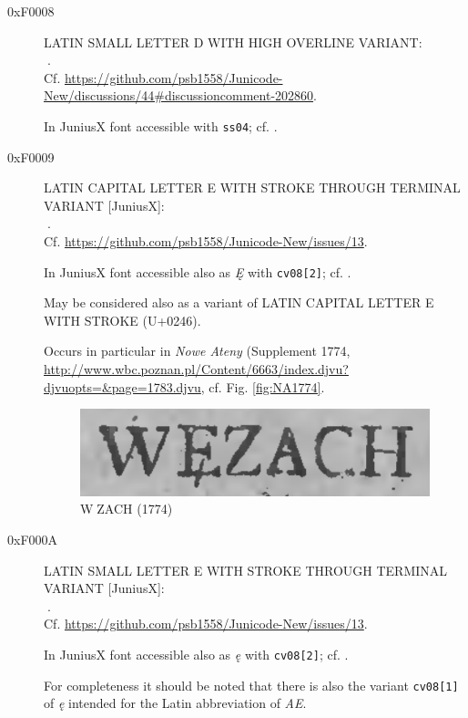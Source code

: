 \documentclass{article}
\newcommand{\Jglyph}[1]{{\relsize{2}\J#1}}
\begin{document}
\begin{description}
  
\item [0xF0008] LATIN SMALL LETTER D WITH HIGH OVERLINE VARIANT:\\
  \Jglyph{󰀈}.\\ Cf. \url{https://github.com/psb1558/Junicode-New/discussions/44#discussioncomment-202860}.

    In JuniusX font accessible  with \texttt{ss04};
  cf. \autocite[p. 6]{baker20:_opent_featur_junius_junius}.

  
\item [0xF0009] LATIN CAPITAL LETTER E WITH STROKE THROUGH TERMINAL VARIANT [JuniusX]:\\
  \Jglyph{󰀉}.\\ Cf. \url{https://github.com/psb1558/Junicode-New/issues/13}.
  
  In JuniusX font accessible also as \textit{Ę} with \texttt{cv08[2]};
  cf. \autocite[p. 8]{baker20:_opent_featur_junius_junius}.

 May be considered also as a variant of LATIN CAPITAL LETTER E WITH
 STROKE (U+0246).

 Occurs in particular in \textit{Nowe Ateny} (Supplement 1774,
 \url{http://www.wbc.poznan.pl/Content/6663/index.djvu?djvuopts=&page=1783.djvu},
 cf. Fig. \vref{fig:NA1774}.
 

  \begin{figure}[h]
    \includegraphics[width=1.3\textwidth]{img/00435077wezach}
    \caption{\J W󰀉ZACH (1774)}
    \label{fig:NA1774}
  \end{figure}

 \item [0xF000A] LATIN SMALL LETTER E WITH STROKE THROUGH TERMINAL VARIANT [JuniusX]:\\
  \Jglyph{󰀊}.\\ Cf. \url{https://github.com/psb1558/Junicode-New/issues/13}.

  In JuniusX font accessible also as \textit{ę} with \texttt{cv08[2]};
  cf. \autocite[p. 7]{baker20:_opent_featur_junius_junius}.

  For completeness it should be noted that there is also the variant
  \texttt{cv08[1]} of \textit{ę} intended for the Latin abbreviation
  of \textit{AE}.


\end{description}
\end{document}
